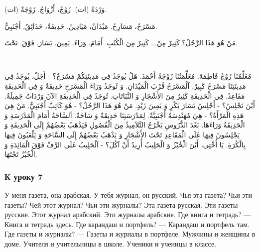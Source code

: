 \documentclass[a5paper]{article}
\begin{document}
وَرْدَةٌ (ات). زَوْجٌ، أَزْوَاجٌ. زَوْجَةٌ (ات).

مَسْرَحٌ، مَسَارِحُ. مَيْدَانٌ، مَيَادِينُ. حَدِيقَةٌ، حَدَائِقُ. أَجْنَبِيٌّ.

مَنْ هُوَ هَذَا الرَّجُلُ؟ كَثِيرٌ مِنْ... كَثِيرٌ مِنَ الْكُتُبِ. أَمَامَ. وَرَاءَ. يَمِينَ. يَسَارَ. فَوْقَ. تَحْتَ.

\_\_\_\_\_\_\_\_\_\_\_\_\_\_\_\_\_\_\_\_\_\_\_\_

مُعَلِّمُنَا زَوْجُ فَاطِمَةَ. مُعَلِّمَتُنَا زَوْجَةُ أَحْمَدَ. هَلْ يُوجَدُ فِي مَدِينَتِكُمْ مَسْرَحٌ؟ - أَجَلْ، يُوجَدُ فِي مَدِينَتِنَا مَسْرَحٌ كَبِيرٌ. اَلْمَسْرَحُ قُرْبَ الْمَيْدَانِ. وَ تُوجَدُ وَرَاءَ الْمَسْرَحِ حَدِيقَةٌ وَ فِي الْحَدِيقَةِ مَقَاعِدُ. فِي الْحَدِيقَةِ كَثِيرٌ مِنَ الأَشْجَارِ وَ النَّبَاتَاتِ. تُوجَدُ فِي الْحَدِيقَةِ الآنَ وَرْدَاتٌ جَمِيلَةٌ. أَيْنَ تَجْلِسُ؟ - أَجْلِسُ يَسَارَ بَكْرٍ وَ يَمِينَ زَيْدٍ. مَنْ هُوَ هَذَا الرَّجُلُ؟ - هُوَ كَاتِبٌ أَجْنَبِيٌّ. مَنْ هِيَ هَذِهِ الْمَرْأَةُ؟ - هِيَ مُهَنْدِسَةٌ أَجْنَبِيَّةٌ. لِمَدْرَسَتِنَا حَدِيقَةٌ وَ سَاحَةٌ. اَلسَّاحَةُ أَمَامَ الْمَدْرَسَةِ وَ الْحَدِيقَةُ وَرَاءَهَا. بَعْدَ الدُّرُوسِ يَخْرُجُ التَّلاَمِيذُ مِنَ الْفُصُولِ فَيَذْهَبُ بَعْضُهُمْ إِلَى الْحَدِيقَةِ وَ يَجْلِسُونَ فِيهَا عَلَى الْمَقَاعِدِ تَحْتَ الأَشْجَارِ وَ يَذْهَبُ بَعْضُهُمْ إِلَى السَّاحَةِ وَ يَلْعَبُونَ فِيهَا بِالْكُرَةِ. يَا أُخْتِي، أَيْنَ الْخُبْزُ وَ الْحَلِيبُ أُرِيدُ أَنْ آكُلَ؟ - اَلْحَلِيبُ عَلَى الرَّفِّ فَوْقَ الْمَائِدَةِ وَ الْخُبْزُ تَحْتَهَا.

\subsubsection{К уроку 7}
У меня газета, она арабская. У тебя журнал, он русский. Чья эта газета? Чьи эти газеты? Чей этот журнал? Чьи эти журналы? Эта газета русская. Эти газеты русские. Этот журнал арабский. Эти журналы арабские. Где книга и тетрадь? — Книга и тетрадь здесь. Где карандаш и портфель? — Карандаш и портфель там. Где газеты и журна­лы? — Газеты и журналы в портфеле. Мужчины и женщины в доме. Учителя и учительницы в школе. Ученики и ученицы в классе.
\end{document}
